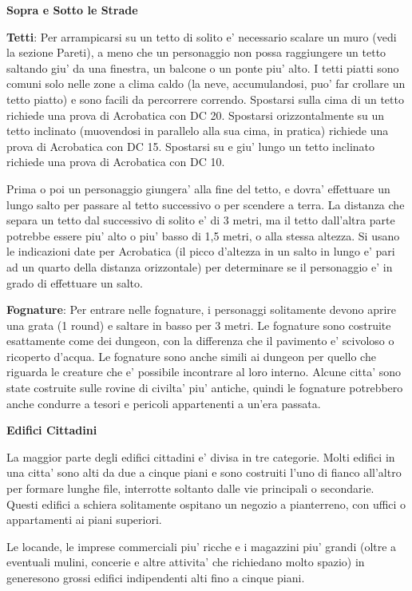 \documentclass[a4paper,11pt,twoside,openany]{book}
\begin{document}
\textbf{Sopra e Sotto le Strade}

\textbf{Tetti}: Per arrampicarsi su un tetto di solito e' necessario scalare un muro (vedi la sezione Pareti), a meno che un personaggio non possa raggiungere un tetto saltando giu' da una finestra, un balcone o un ponte piu' alto. I tetti piatti sono comuni solo nelle zone a clima caldo (la neve, accumulandosi, puo' far crollare un tetto piatto) e sono facili da percorrere correndo. Spostarsi sulla cima di un tetto richiede una prova di Acrobatica con DC 20. Spostarsi orizzontalmente su un tetto inclinato (muovendosi in parallelo alla sua cima, in pratica) richiede una prova di Acrobatica con DC 15. Spostarsi su e giu' lungo un tetto inclinato richiede una prova di Acrobatica con DC 10.

Prima o poi un personaggio giungera' alla fine del tetto, e dovra' effettuare un lungo salto per passare al tetto successivo o per scendere a terra. La distanza che separa un tetto dal successivo di solito e' di 3 metri, ma il tetto dall'altra parte potrebbe essere piu' alto o piu' basso di 1,5 metri, o alla stessa altezza. Si usano le indicazioni date per Acrobatica (il picco d'altezza in un salto in lungo e' pari ad un quarto della distanza orizzontale) per determinare se il personaggio e' in grado di effettuare un salto.

\textbf{Fognature}: Per entrare nelle fognature, i personaggi solitamente devono aprire una grata (1 round) e saltare in basso per 3 metri. Le fognature sono costruite esattamente come dei dungeon, con la differenza che il pavimento e' scivoloso o ricoperto d'acqua. Le fognature sono anche simili ai dungeon per quello che riguarda le creature che e' possibile incontrare al loro interno. Alcune citta' sono state costruite sulle rovine di civilta' piu' antiche, quindi le fognature potrebbero anche condurre a tesori e pericoli appartenenti a un'era passata.

\textbf{Edifici Cittadini}

La maggior parte degli edifici cittadini e' divisa in tre categorie. Molti edifici in una citta' sono alti da due a cinque piani e sono costruiti l'uno di fianco all'altro per formare lunghe file, interrotte soltanto dalle vie principali o secondarie. Questi edifici a schiera solitamente ospitano un negozio a pianterreno, con uffici o appartamenti ai piani superiori.

Le locande, le imprese commerciali piu' ricche e i magazzini piu' grandi (oltre a eventuali mulini, concerie e altre attivita' che richiedano molto spazio) in generesono grossi edifici indipendenti alti fino a cinque piani.
\end{document}
